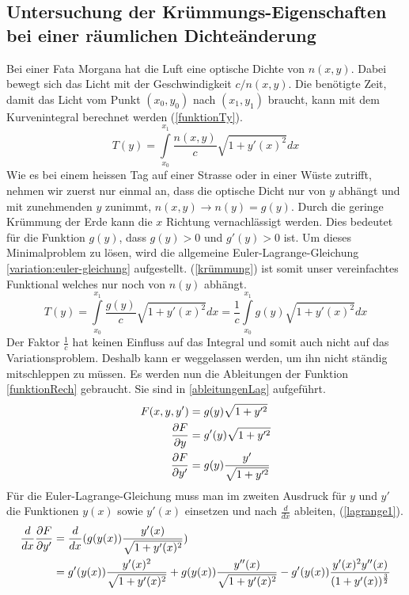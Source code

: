 \subsection{Untersuchung der Krümmungs-Eigenschaften bei einer räumlichen Dichteänderung \label{sec:Krümmung}}
Bei einer Fata Morgana hat die Luft eine optische Dichte von $n(x,y)$. 
Dabei bewegt sich das Licht mit der Geschwindigkeit $c/n(x,y)$. 
Die benötigte Zeit, damit das Licht vom Punkt $(x_0, y_0)$ nach $(x_1, y_1)$ braucht,
kann mit dem Kurvenintegral berechnet werden (\eqref{funktionTy}).
\begin{equation}
	T(y) = \int \limits_{x_0}^{x_1} \frac{n(x,y)}{c} \sqrt{1 + y'(x)^2} dx
	\label{funktionTy}
\end{equation}
Wie es bei einem heissen Tag auf einer Strasse oder in einer Wüste zutrifft,
nehmen wir zuerst nur einmal an, dass die optische Dicht nur von $y$ abhängt und mit zunehmenden $y$ zunimmt,
$n(x,y) \rightarrow n(y)=g(y)$.
Durch die geringe Krümmung der Erde kann die $x$ Richtung vernachlässigt werden.
Dies bedeutet für die Funktion $g(y)$, dass $g(y) > 0$ und $g'(y) > 0 $ ist.
Um dieses Minimalproblem zu lösen, wird die allgemeine Euler-Lagrange-Gleichung  \eqref{variation:euler-gleichung}  aufgestellt. (\eqref{krümmung}) ist somit unser vereinfachtes Funktional welches nur noch von $n(y)$ abhängt.
\begin{equation}
	T(y) = \int \limits_{x_0}^{x_1} \frac{g(y)}{c} \sqrt{1 + y'(x)^2} dx = \frac{1}{c} \int \limits_{x_0}^{x_1} g(y) \sqrt{1 + y'(x)^2} dx
	\label{krümmung}
\end{equation}
Der Faktor $\frac{1}{c}$ hat keinen Einfluss auf das Integral und somit auch nicht auf das Variationsproblem. Deshalb kann er weggelassen werden, um ihn nicht ständig mitschleppen zu müssen.
Es werden nun die Ableitungen der Funktion \ref{funktionRech} gebraucht. Sie sind in \ref{ableitungenLag} aufgeführt.
\begin{align}
	F(x,y,y') &= g(y) \sqrt{1 + y'^2} \label{funktionRech} \\
	\frac{\partial F}{\partial y} &= g'(y) \sqrt{1 + y'^2} \notag \\
	\frac{\partial F}{\partial y'} &= g(y) \frac{y'}{\sqrt{1 + y'^2}} \label{ableitungenLag}
\end{align}
Für die Euler-Lagrange-Gleichung muss man im zweiten Ausdruck für $y$ und $y'$ die Funktionen $y(x)$ 
sowie $y'(x)$ einsetzen und nach $\frac{d}{dx}$ ableiten, (\eqref{lagrange1}).
\begin{align}
	\frac{d}{dx} \frac{\partial F}{\partial y'} &= \frac{d}{dx} (g(y(x)) \frac{y'(x)}{\sqrt{1 + y'(x)^2}}) \notag \\ 
	&= g'(y(x)) \frac{y'(x)^2}{\sqrt{1 + y'(x)^2}} + g(y(x)) \frac{y''(x)}{\sqrt{1 + y'(x)^2}}
	 - g'(y(x)) \frac{y'(x)^2 y''(x)}{(1 + y'(x))^\frac{3}{2}} 
	 \label{lagrange1}
\end{align}
